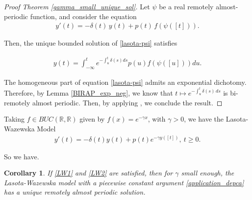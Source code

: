 \documentclass[english,,reqno]{amsart}
\numberwithin{equation}{section}
\theoremstyle{plain}
\newtheorem{cor}[thm]{Corollary}
\theoremstyle{definition}
\theoremstyle{remark}
\begin{document}
\begin{proof}[Proof Theorem \ref{gamma_small_unique_sol}]
Let $\psi$ be a real remotely almost-periodic function, and consider the equation  
\begin{eqnarray}
y'(t) = -\delta(t)\, y(t) + p(t)\, f(\psi([t])). \label{lasota-psi}
\end{eqnarray}

Then, the unique bounded solution of \eqref{lasota-psi} satisfies

\begin{eqnarray*}
y(t)=\int_{-\infty}^{t} e^{ -\int_{u}^{t}\delta (s)ds}  p(u)f(\psi([u]))du.
\end{eqnarray*}

The homogeneous part of equation \eqref{lasota-psi} admits an exponential dichotomy.  
Therefore, by Lemma \ref{BIRAP_exp_neg}, we know that $t\mapsto e^{-\int_{u}^{t} \delta(s)\, ds}$ is bi-remotely almost periodic.  
Then, by applying \cite[Lemma 4]{pinto_remotely}, we conclude the result.
\end{proof}

Taking $f\in BUC(\mathbb{R},\mathbb{R})$ given by $f(x)=e^{ -\gamma x}$, with $\gamma>0$, we have the Lasota-Wazewska Model
\begin{eqnarray}
y'(t)=-\delta(t) y(t)+p(t)e^{-\gamma y([t])},\ t\geq 0. \label{application_depca}
\end{eqnarray}

So we have.

\begin{cor}
If \ref{LW1} and \ref{LW2} are satisfied, then for $\gamma$ small enough, the Lasota-Wazewska model with a piecewise constant argument \eqref{application_depca} has a unique remotely almost periodic solution.
\end{cor}


\printbibliography[heading=bibintoc,title={Bibliography}]
\end{document}
